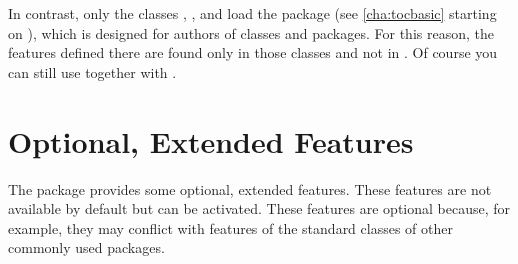 \iftrue %
In contrast, only the \KOMAScript{} classes , ,
and  load the \hyperref[cha:tocbasic]{}
package (see \autoref{cha:tocbasic} starting on ),
which is designed for authors of classes and packages. For this reason, the
features defined there are found only in those classes and not in
. Of course you can still use
\hyperref[cha:tocbasic]{} together with
.%
\fi




\section{Optional, Extended Features}

The  package provides some optional, extended features.
These features are not available by default but can be activated. These
features are optional because, for example, they may conflict with features of
the standard classes of other commonly used packages.

